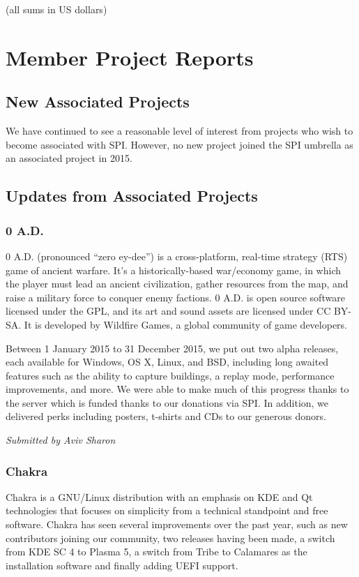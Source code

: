 \documentclass[letterpaper]{report}
\begin{document}
(all sums in US dollars)


\chapter{Member Project Reports}

\section{New Associated Projects}

We have continued to see a reasonable level of interest from projects who
wish to become associated with SPI.  However, no new project joined the
SPI umbrella as an associated project in 2015.


\section{Updates from Associated Projects}

\subsection{0 A.D.}

0 A.D. (pronounced ``zero ey-dee'') is a cross-platform, real-time strategy
(RTS) game of ancient warfare. It's a historically-based war/economy game,
in which the player must lead an ancient civilization, gather resources
from the map, and raise a military force to conquer enemy factions. 0 A.D.
is open source software licensed under the GPL, and its art and sound
assets are licensed under CC BY-SA. It is developed by Wildfire Games, a
global community of game developers.

Between 1 January 2015 to 31 December 2015, we put out two alpha releases,
each available for Windows, OS X, Linux, and BSD, including long awaited
features such as the ability to capture buildings, a replay mode,
performance improvements, and more. We were able to make much of this
progress thanks to the server which is funded thanks to our donations via
SPI. In addition, we delivered perks including posters, t-shirts and CDs to
our generous donors.

{\em Submitted by Aviv Sharon}

\subsection{Chakra}

Chakra is a GNU/Linux distribution with an emphasis on KDE and Qt
technologies that focuses on simplicity from a technical standpoint and
free software.  Chakra has seen several improvements over the past year,
such as new contributors joining our community, two releases having been
made, a switch from KDE SC 4 to Plasma 5, a switch from Tribe to Calamares
as the installation software and finally adding UEFI support.
\end{document}
